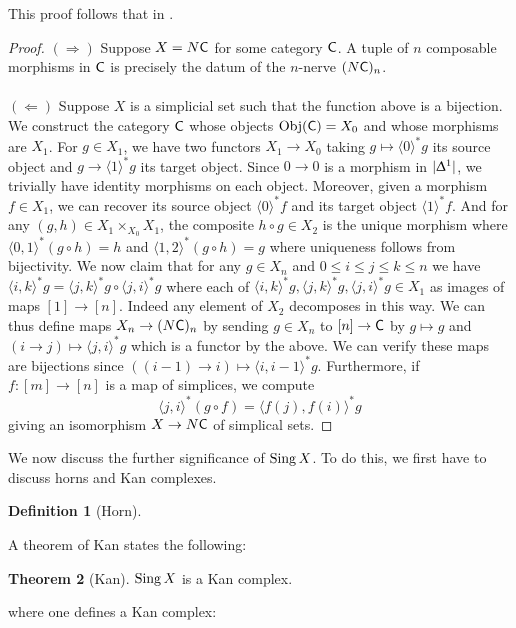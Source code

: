 \documentclass{amsart}
\theoremstyle{definition}
\newtheorem{theorem}{Theorem}[section]
\newtheorem{definition}[theorem]{Definition}
\numberwithin{equation}{section}
\begin{document}
This proof follows that in \cite[Proposition 4.8]{Rezk}.
\begin{proof}
  $(\Longrightarrow)$ Suppose $X=N\mathsf{C}$ for some category $\mathsf{C}$. A tuple of $n$ composable morphisms in $\mathsf{C}$ is precisely the datum of the $n$-nerve $(N\mathsf{C})_{n}$. 
  \\\\
  $(\Longleftarrow)$ Suppose $X$ is a simplicial set such that the function above is a bijection. We construct the category $\mathsf{C}$ whose objects $\mathrm{Obj}(\mathsf{C})=X_{0}$ and whose morphisms are $X_{1}$. For $g\in X_{1}$, we have two functors $X_{1}\to X_{0}$ taking $g\mapsto\langle0\rangle^{*}g$ its source object and $g\to\langle1\rangle^{*}g$ its target object. Since $0\to0$ is a morphism in $|\Updelta^{1}|$, we trivially have identity morphisms on each object. Moreover, given a morphism $f\in X_{1}$, we can recover its source object $\langle0\rangle^{*}f$ and its target object $\langle1\rangle^{*}f$. And for any $(g,h)\in X_{1}\times_{X_{0}}X_{1}$, the composite $h\circ g\in X_{2}$ is the unique morphism where $\langle0,1\rangle^{*}(g\circ h)=h$ and $\langle 1,2\rangle^{*}(g\circ h)=g$ where uniqueness follows from bijectivity. We now claim that for any $g\in X_{n}$ and $0\leq i\leq j\leq k\leq n$ we have $\langle i,k\rangle^{*}g=\langle j,k\rangle^{*}g\circ\langle j,i\rangle^{*}g$ where each of $\langle i,k\rangle^{*}g,\langle j,k\rangle^{*}g,\langle j,i\rangle^{*}g\in X_{1}$ as images of maps $[1]\to[n]$. Indeed any element of $X_{2}$ decomposes in this way. We can thus define maps $X_{n}\to (N\mathsf{C})_{n}$ by sending $g\in X_{n}$ to $[n]\to\mathsf{C}$ by $g\mapsto g$ and $(i\to j)\mapsto \langle j, i\rangle^{*}g$ which is a functor by the above. We can verify these maps are bijections since $((i-1)\to i)\mapsto\langle i, i-1\rangle^{*}g$. Furthermore, if $f:[m]\to [n]$ is a map of simplices, we compute
  $$\langle j,i\rangle^{*}(g\circ f) = \langle f(j), f(i)\rangle^{*}g$$
  giving an isomorphism $X\to N\mathsf{C}$ of simplical sets. 
\end{proof}
We now discuss the further significance of $\operatorname{Sing} X$. To do this, we first have to discuss horns and Kan complexes. 
\begin{definition}[Horn]
  
\end{definition}

A theorem of Kan states the following:
\begin{theorem}[Kan]
  $\operatorname{Sing} X$ is a Kan complex. 
\end{theorem}
where one defines a Kan complex:
\newpage
\printbibliography
\end{document}
